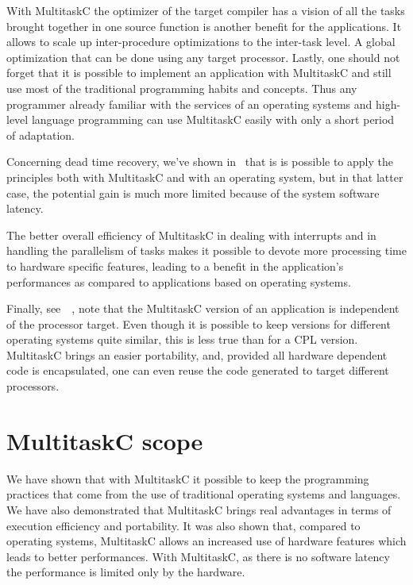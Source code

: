\documentclass[10pt]{report}
\begin{document}
With MultitaskC the optimizer of the target compiler has a vision of all the tasks brought together in one source function
is another benefit for the applications. It allows to scale up inter-procedure optimizations to the inter-task level. A global 
optimization that can be done using any target processor. Lastly, one should not forget that it is possible to implement an 
application with MultitaskC and still use most of the traditional programming habits and concepts. Thus any programmer already 
familiar with the services of an operating systems and high-level language programming can use MultitaskC easily with only a short 
period of adaptation.

Concerning dead time recovery, we've shown in~\cite{Delchini:95} that is is possible to apply the principles both with MultitaskC 
and with an operating system, but in that latter case, the potential gain is much more limited because of the system software latency.

The better overall efficiency of MultitaskC in dealing with interrupts and in handling the parallelism of tasks makes it possible 
to devote more processing time to hardware specific features, leading to a benefit in the application's performances as compared to 
applications based on operating systems. 

Finally, see~~\cite{Delchini:95}, note that the MultitaskC version of an application is independent of the processor target. 
Even though it is possible to keep versions for different operating systems quite similar, this is less true than for a CPL version. 
MultitaskC brings an easier portability, and, provided all hardware dependent code is encapsulated, one can even reuse the code 
generated to target different processors.

\section{MultitaskC scope}

We have shown that with MultitaskC it possible to keep the programming practices that come from the use of traditional
operating systems and languages. We have also demonstrated that MultitaskC brings real advantages in terms of
execution efficiency and portability. It was also shown that, compared to operating systems, MultitaskC allows an increased use of 
hardware features which leads to better performances. With MultitaskC, as there is no software latency the performance is limited 
only by the hardware.
\end{document}
